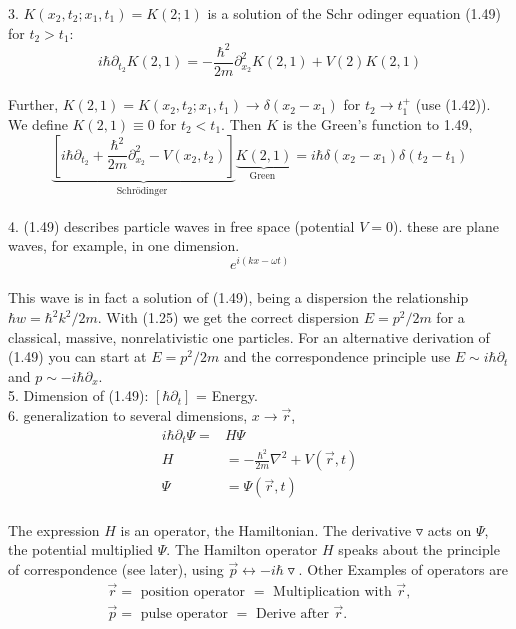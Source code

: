 3. $K (x_2, t_2; x_1, t_1) = K (2; 1)$ is a solution of the Schr odinger equation
(1.49) for $t_2> t_1$:
\\
\begin{equation}
i \hbar \partial_{t_{2}} K(2,1)=-\frac{\hbar^{2}}{2 m} \partial_{x_{2}}^{2} K(2,1)+V(2) K(2,1)
\end{equation}\\
Further, $K (2, 1) = K (x_2, t_2; x_1, t_1)\to \delta(x_2 - x_1)$ for $t_2\to t_1^+$ (use
(1.42)). We define $K (2, 1)\equiv 0$  for $t_2 <t_1$. Then $K$ is the
Green's function to 1.49,
\\
\begin{equation}
\underbrace{\left[i \hbar \partial_{t_{2}}+\frac{\hbar^{2}}{2 m} \partial_{x_{2}}^{2}-V\left(x_{2}, t_{2}\right)\right]}_{\text {Schrödinger }} \underbrace{K(2,1)}_{\text {Green }}=i \hbar \delta\left(x_{2}-x_{1}\right) \delta\left(t_{2}-t_{1}\right)
\end{equation}\\
4. (1.49) describes particle waves in free space (potential $V = 0$).
these are plane waves, for example, in one dimension.
\\
\begin{equation}
e^{i(k x-\omega t)}
\end{equation}\\
This wave is in fact a solution of (1.49), being a dispersion the relationship $\hbar w=\hbar^2k^2/2m$. With (1.25) we get the correct dispersion $E=p^2/2m$ for a classical, massive, nonrelativistic one particles. For an alternative derivation of (1.49) you can start at $E=p^2/2m$ and the correspondence principle use $E\sim i\hbar\partial_t$ and $p\sim -i\hbar\partial_x$.\\
5. Dimension of (1.49): $[\hbar\partial_t]$ = Energy.\\
6. generalization to several dimensions, $x\to \vec{r}$,
\\
\begin{equation}
\begin{aligned} i \hbar \partial_{t} \Psi=& H \Psi \\ H &=-\frac{\hbar^{2}}{2 m} \nabla^{2}+V(\vec{r}, t) \\ \Psi &=\Psi(\vec{r}, t) \end{aligned}
\end{equation}\\
The expression $H$ is an operator, the Hamiltonian. The derivative $\triangledown$ acts on $\Psi$, the potential multiplied $\Psi$.
The Hamilton operator $H$ speaks about the principle of correspondence
(see later), using $\vec{p}\leftrightarrow -i\hbar\triangledown$. Other
Examples of operators are
\\
\begin{equation}
\begin{array}{l}{\vec{r}=\text { position operator }=\text { Multiplication with } \vec{r},} \\ {\vec{p}=\text { pulse operator }=\text { Derive after } \vec{r} .}\end{array}
\end{equation}\\

